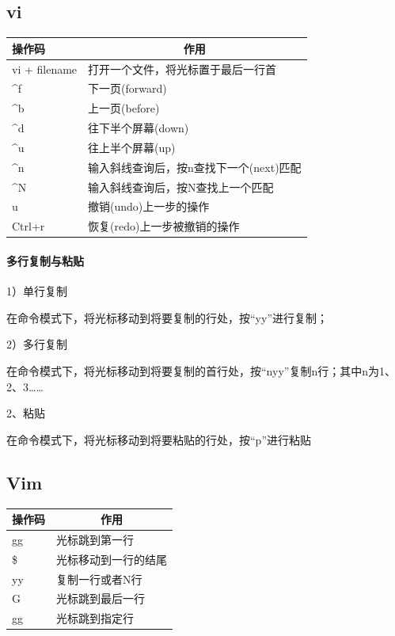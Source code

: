 \documentclass{book}
\begin{document}
\subsection{vi}

\begin{tabular}{l|p{10cm}}
	\multirow{1}{*}{操作码}			
	& \multicolumn{1}{c}{作用}\\	 
	\hline
	vi + filename & 打开一个文件，将光标置于最后一行首\\
	\hline
	\textasciicircum f & 下一页(forward)\\
	\hline 
	\textasciicircum b & 上一页(before)\\
	\hline
	\textasciicircum d & 往下半个屏幕(down)\\
	\hline
	\textasciicircum u & 往上半个屏幕(up)\\
	\hline
	\textasciicircum n & 输入斜线查询后，按n查找下一个(next)匹配\\
	\hline
	\textasciicircum N & 输入斜线查询后，按N查找上一个匹配\\
	\hline
	u & 撤销(undo)上一步的操作\\
	\hline
	Ctrl+r & 恢复(redo)上一步被撤销的操作\\
	\hline
	\end{tabular}

\paragraph{多行复制与粘贴}

1）单行复制

在命令模式下，将光标移动到将要复制的行处，按“yy”进行复制；

2）多行复制

在命令模式下，将光标移动到将要复制的首行处，按“nyy”复制n行；其中n为1、2、3……

2、粘贴

在命令模式下，将光标移动到将要粘贴的行处，按“p”进行粘贴

\subsection{Vim}

\begin{tabular}{l|p{10cm}}
	\multirow{1}{*}{操作码}			
	& \multicolumn{1}{c}{作用}\\	 
	\hline
	gg & 光标跳到第一行\\
	\hline
	\$ & 光标移动到一行的结尾\\
	\hline
	[N]yy & 复制一行或者N行\\
	\hline
	G & 光标跳到最后一行\\
	\hline
	[n]gg & 光标跳到指定行\\
	\hline
\end{tabular}
\end{document}
